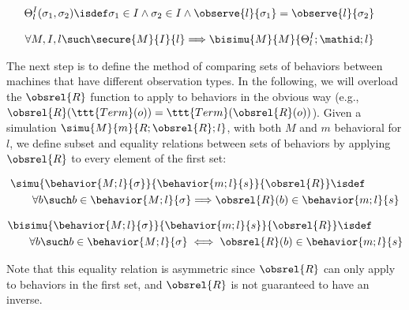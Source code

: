 \begin{definition}
{\small
\begin{align*}
& \Theta^{I}_l(\sigma_1,\sigma_2) \isdef 
\sigma_1 \in I \land \sigma_2 \in I \land
\observe{l}{\sigma_1} = \observe{l}{\sigma_2}
\end{align*}}
\end{definition}

\begin{lem}
\label{secure-bisim}
{\small
\begin{align*}
& \forall M, I, l \such \secure{M}{I}{l} \Longrightarrow 
\bisimu{M}{M}{\Theta^{I}_l;\mathid;l}
\end{align*}}
\end{lem}

The next step is to define the method of comparing sets of behaviors
between machines that have different observation types.
In the following, we will overload the $\obsrel{R}$ function to apply
to behaviors in the obvious way 
(e.g., $\obsrel{R}(\ttt{Term}(o)) = \ttt{Term}(\obsrel{R}(o))$).
Given a simulation $\simu{M}{m}{R;\obsrel{R};l}$, with both $M$ and
$m$ behavioral for $l$, we define subset and equality relations 
between sets of behaviors by applying $\obsrel{R}$ to every element 
of the first set:
\begin{definition}
\label{beh-subset}
{\small
\begin{align*}
& \simu{\behavior{M;l}{\sigma}}{\behavior{m;l}{s}}{\obsrel{R}}
\isdef \\
& \qquad \forall b \such b \in \behavior{M;l}{\sigma} \Longrightarrow
\obsrel{R}(b) \in \behavior{m;l}{s}
\end{align*}}
\end{definition}

\begin{definition}
\label{beh-equality}
{\small
\begin{align*}
& \bisimu{\behavior{M;l}{\sigma}}{\behavior{m;l}{s}}{\obsrel{R}}
\isdef \\
& \qquad \forall b \such b \in \behavior{M;l}{\sigma} \iff
\obsrel{R}(b) \in \behavior{m;l}{s}
\end{align*}}
\end{definition}

\noindent
Note that this equality relation is asymmetric since $\obsrel{R}$ can only
apply to behaviors in the first set, and $\obsrel{R}$ is not guaranteed
to have an inverse.

